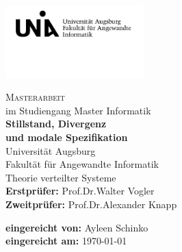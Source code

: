 \begin{titlepage}
\includegraphics[width=0.4\textwidth]{Uni_Aug_Logo_FAI_schwarz.png}
\vspace{-1cm}
\begin{center}
  \LARGE \textsc{Masterarbeit}\\
  \normalsize im Studiengang Master Informatik\\
  \vfill
  \Huge \textbf{Stillstand, Divergenz\\
  und modale Spezifikation}\\
  \vfill
  \Large Universität Augsburg\\
  Fakultät für Angewandte Informatik\\
  Theorie verteilter Systeme\\
  \vspace{1.5cm}
  \rmfamily \large \textbf{Erstprüfer:} Prof.\;Dr.\;Walter Vogler\\
  \rmfamily \large \textbf{Zweitprüfer:} Prof.\;Dr.\;Alexander Knapp
\end{center}
\vspace{1cm}
\large \textbf{eingereicht von:}
Ayleen Schinko\\
\textbf{eingereicht am:}
\today {}\\
\end{titlepage}
